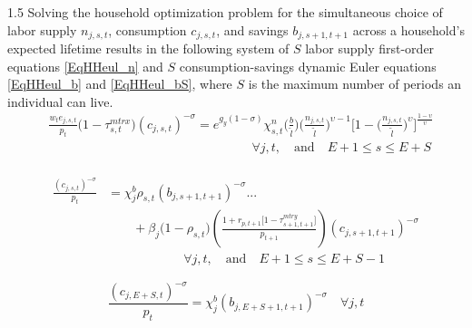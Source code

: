 \documentclass[letterpaper,12pt]{article}
\theoremstyle{definition}
\begin{document}
\begin{spacing}{1.5}
    Solving the household optimization problem for the simultaneous choice of labor supply $n_{j,s,t}$, consumption $c_{j,s,t}$, and savings $b_{j,s+1,t+1}$ across a household's expected lifetime results in the following system of $S$ labor supply first-order equations \eqref{EqHHeul_n} and $S$ consumption-savings dynamic Euler equations \eqref{EqHHeul_b} and \eqref{EqHHeul_bS}, where $S$ is the maximum number of periods an individual can live.
    \begin{equation}\label{EqHHeul_n}
      \begin{split}
        &\frac{w_t e_{j,s,t}}{p_t}\bigl(1 - \tau^{mtrx}_{s,t}\bigr)(c_{j,s,t})^{-\sigma} = e^{g_y(1-\sigma)}\chi^n_{s,t}\biggl(\frac{b}{\tilde{l}}\biggr)\biggl(\frac{n_{j,s,t}}{\tilde{l}}\biggr)^{\upsilon-1}\Biggl[1 - \biggl(\frac{n_{j,s,t}}{\tilde{l}}\biggr)^\upsilon\Biggr]^{\frac{1-\upsilon}{\upsilon}} \\
        &\qquad\qquad\qquad\qquad\qquad\qquad\qquad\qquad\forall j,t, \quad\text{and}\quad E+1\leq s\leq E+S \\
      \end{split}
    \end{equation}

    \begin{equation}\label{EqHHeul_b}
      \begin{split}
        \frac{(c_{j,s,t})^{-\sigma}}{p_t} &= \chi^b_j\rho_{s,t}(b_{j,s+1,t+1})^{-\sigma} ... \\
        &\qquad+ \beta_j\bigl(1 - \rho_{s,t}\bigr)\left(\frac{1 + r_{p,t+1}\bigl[1 - \tau^{mtry}_{s+1,t+1}\bigr]}{p_{t+1}}\right)(c_{j,s+1,t+1})^{-\sigma} \\
        &\qquad\qquad\qquad \forall j,t, \quad\text{and}\quad E+1\leq s\leq E+S-1
      \end{split}
    \end{equation}

    \begin{equation}\label{EqHHeul_bS}
      \frac{(c_{j,E+S,t})^{-\sigma}}{p_t} = \chi^b_j(b_{j,E+S+1,t+1})^{-\sigma} \quad\forall j,t
    \end{equation}


\end{spacing}
\end{document}
